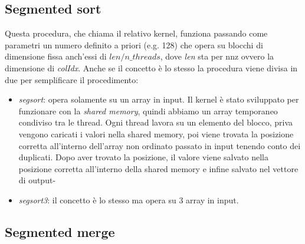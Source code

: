 \documentclass[]{IEEEtran}
\begin{document}
	\subsection{Segmented sort}
	\label{seg-sort}
	Questa procedura, che chiama il relativo kernel, funziona passando come parametri un numero definito a priori (e.g. 128) che opera su blocchi di dimensione fissa anch'essi di $ len/n\_threads $, dove \textit{len} sta per nnz ovvero la dimensione di \textit{colIdx}.\newline
	Anche se il concetto è lo stesso la procedura viene divisa in due per semplificare il procedimento:
	\begin{itemize}
		\item \textit{segsort}: opera solamente su un array in input. Il kernel è stato sviluppato per funzionare con la \textit{shared memory}, quindi abbiamo un array temporaneo condiviso tra le thread. Ogni thread lavora su un elemento del blocco, priva vengono caricati i valori nella shared memory, poi viene trovata la posizione corretta all'interno dell'array non ordinato passato in input tenendo conto dei duplicati. Dopo aver trovato la posizione, il valore viene salvato nella posizione corretta all'interno della shared memory e infine salvato nel vettore di output-
		\item \textit{segsort3}: il concetto è lo stesso ma opera su 3 array in input.
	\end{itemize}
	
	\subsection{Segmented merge}
	\label{seg-merge}
\end{document}
